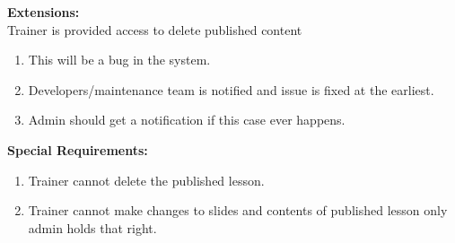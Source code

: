 \documentclass{report}
\begin{document}
\textbf{Extensions:}\\
Trainer is provided access to delete published content
\begin{enumerate}
    \item This will be a bug in the system.
    \item Developers/maintenance team is notified and issue is fixed at the earliest.
    \item Admin should get a notification if this case ever happens.
\end{enumerate}
\textbf{Special Requirements:}
\begin{enumerate}
    \item Trainer cannot delete the published lesson.
    \item Trainer cannot make changes to slides and contents of published lesson only admin holds that right.
\end{enumerate}
\end{document}
